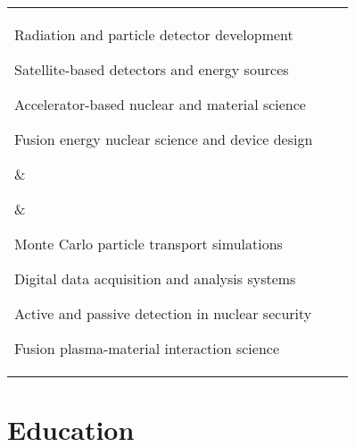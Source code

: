 \documentclass[10pt]{article}
\begin{document}
\begin{tabular}[t]{@{}p{\textwidth-\rcollength-\spacewidth}@{}p{\spacewidth}@{}p{\rcollength}}%

\parbox{\textwidth-\rcollength-\spacewidth}{%
\begin{innerlist}
\item Radiation and particle detector development
\item Satellite-based detectors and energy sources    
\item Accelerator-based nuclear and material science
\item Fusion energy nuclear science and device design
\end{innerlist}
}
& \parbox{\spacewidth}{\centering} &

\parbox{\rcollength}{%

\begin{innerlist}
\item Monte Carlo particle transport simulations
\item Digital data acquisition and analysis systems
\item Active and passive detection in nuclear security
\item Fusion plasma-material interaction science
\end{innerlist}
}
\end{tabular}

\vspace{0.4cm}

\section{Education}
\end{document}
